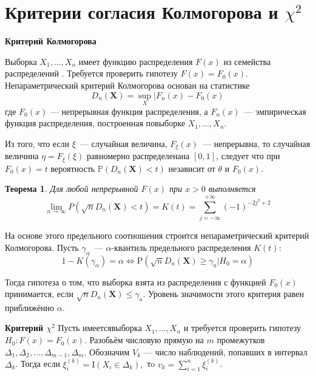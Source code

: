 \documentclass[oneside,final,14pt]{extreport}
\newtheorem{thm}{Теорема}[section]
\theoremstyle{definition}
\begin{document}
\section{Критерии согласия Колмогорова и $\chi^{2}$}

{\bf Критерий Колмогорова}

Выборка $X_1, \ldots, X_n$ имеет функцию распределения $F(x)$ из семейства распределений . Требуется проверить гипотезу $F(x)=F_{0}(x)$. Непараметрический критерий Колмогорова основан на статистике
\begin{equation*}
    D_{n}(\mathbf{X})=\sup _{X} | F_{n}(x)-F_{0}(x)
\end{equation*}
где $F_{0}(x)$  —  непрерывная функция распределения, а $F_{n}(x)$~---  эмпирическая функция распределения, построенная повыборке $X_1, \ldots, X_n$.

Из того, что если $\xi$~--- случайная величина, $F_{\xi}(x)$~--- непрерывна, то случайная величина $\eta=F_{\xi}(\xi)$ равномерно распределенана $[0,1]$, следует что при $F_{0}(x)=t$ вероятность $\mathbb{P}\left(D_{n}(\mathbf{X})<t\right)$ независит от $\theta$ и $F_{0}(x)$.

\begin{thm}
    Для любой непрерывной $F(x)$ при $x > 0$ выполняется
    \begin{equation*}
        \lim _{n \rightarrow \infty} P\left(\sqrt{n} D_{n}(\mathbf{X})<t\right)=K(t)=\sum_{j=-\infty}^{+\infty}(-1)^{-2 j^{2}+2}
    \end{equation*}
\end{thm}

На основе этого предельного соотношения строится непараметрический критерий Колмогорова. Пусть $\gamma_{\alpha}$~--- $\alpha$-квантиль предельного распределения $K(t)$:
\begin{equation*}
    1-K\left(\gamma_{\alpha}\right)=\alpha \Leftrightarrow \mathrm{P}\left(\sqrt{n} D_{n}(\mathbf{X}) \geq \gamma_{a} | H_{0}=\alpha\right)
\end{equation*}

Тогда гипотеза о том, что выборка взята из распределения с функцией $F_{0}(x)$ принимается, если $\sqrt{n} D_{n}(\mathbf{X}) \leq \gamma_{a}$. Уровень значимости этого критерия равен приближённо $\alpha$.

{\bf Критерий $\chi^{2}$}
Пусть имеетсявыборка $X_1, \ldots, X_n$ и требуется проверить гипотезу $H_{0}: F(x)=F_{0}(x)$. Разобьём числовую прямую на $m$ промежутков $\Delta_{1}, \Delta_{2}, \ldots, \Delta_{m-1}, \Delta_{m}$. Обозначим $V_{k}$ — число наблюдений, попавших в интервал $\Delta_{k}$. Тогда если $\xi_{i}^{(k)}=\mathrm{I}\left(X_{i} \in \Delta_{k}\right),$ тo $v_{k}=\sum_{i=1}^{n} \xi_{i}^{(k)}$.
\end{document}
